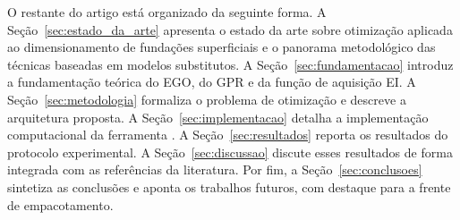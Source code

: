 O restante do artigo está organizado da seguinte forma. A Seção~\ref{sec:estado_da_arte} apresenta o estado da arte sobre otimização aplicada ao dimensionamento de fundações superficiais e o panorama metodológico das técnicas baseadas em modelos substitutos. A Seção~\ref{sec:fundamentacao} introduz a fundamentação teórica do EGO, do GPR e da função de aquisição EI. A Seção~\ref{sec:metodologia} formaliza o problema de otimização e descreve a arquitetura proposta. A Seção~\ref{sec:implementacao} detalha a implementação computacional da ferramenta \fundaai{}. A Seção~\ref{sec:resultados} reporta os resultados do protocolo experimental. A Seção~\ref{sec:discussao} discute esses resultados de forma integrada com as referências da literatura. Por fim, a Seção~\ref{sec:conclusoes} sintetiza as conclusões e aponta os trabalhos futuros, com destaque para a frente de empacotamento.
